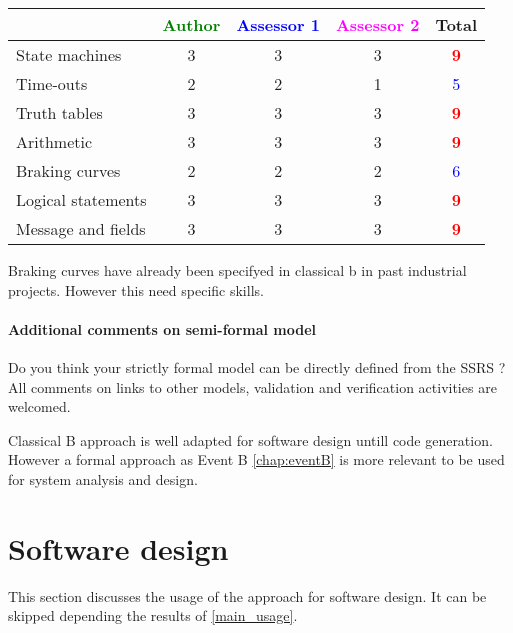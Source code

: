 \begin{tabular}{|l | c | c | c | c|}
\hline
& \textcolor{green}{Author} & \textcolor{blue}{Assessor 1} & \textcolor{magenta}{Assessor 2} & Total \\
\hline 
State machines  & 3     & 3     & 3     & \textcolor{red}{\textbf{9}} \\
\hline
Time-outs  & 2     & 2     & 1     & \textcolor{blue}{5} \\
\hline
Truth tables  & 3     & 3     & 3     & \textcolor{red}{\textbf{9}} \\
\hline
Arithmetic  & 3     & 3     & 3     & \textcolor{red}{\textbf{9}} \\
\hline
Braking curves  & 2     & 2     & 2     & \textcolor{blue}{6} \\
\hline
Logical statements & 3     & 3     & 3      & \textcolor{red}{\textbf{9}} \\
\hline
Message and fields & 3     & 3     & 3     & \textcolor{red}{\textbf{9}} \\
\hline
\end{tabular}


\begin{author_comment}
Braking curves have already been specifyed in classical b  in past industrial projects. However this need specific skills.
\end{author_comment}


\paragraph{Additional comments on semi-formal  model} Do you think your strictly formal  model can be directly defined from the SSRS ?
All comments on links to  other models, validation and verification activities are welcomed.



\begin{author_comment}
Classical B  approach is well adapted for software design untill code generation. However a formal approach as Event B \ref{chap:eventB} is more relevant to be used for system analysis and design.
\end{author_comment}


\section{Software design}
This section discusses the usage of the approach for software design.
It can be skipped depending the results of \ref{main_usage}.

